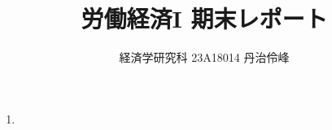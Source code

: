 \documentclass{jsarticle}
\begin{document}
\title{労働経済I 期末レポート}
\author{経済学研究科 23A18014 丹治伶峰}
\date{}
\maketitle

\begin{enumerate}

\item 

\end{enumerate}
\end{document}
